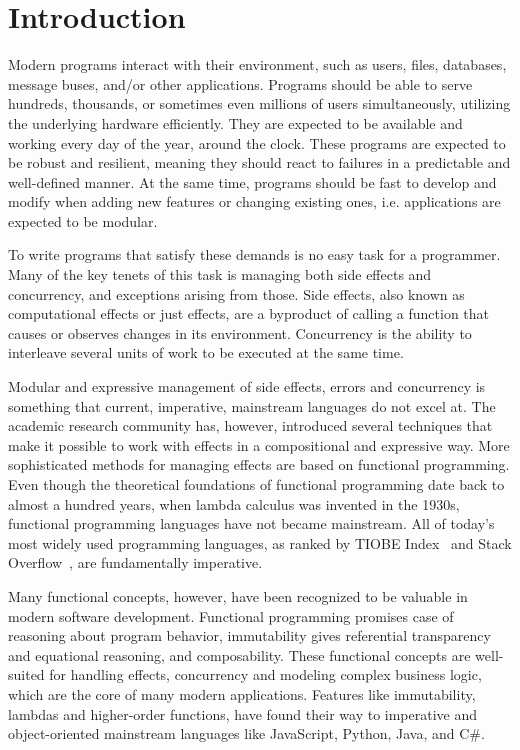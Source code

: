 \chapter{Introduction} \label{Introduction}

Modern programs interact with their environment, such as users, files, databases, message buses, and/or other applications. Programs should be able to serve hundreds, thousands, or sometimes even millions of users simultaneously, utilizing the underlying hardware efficiently. They are expected to be available and working every day of the year, around the clock. These programs are expected to be robust and resilient, meaning they should react to failures in a predictable and well-defined manner. At the same time, programs should be fast to develop and modify when adding new features or changing existing ones, i.e. applications are expected to be modular.

To write programs that satisfy these demands is no easy task for a programmer. Many of the key tenets of this task is managing both side effects and concurrency, and exceptions arising from those. Side effects, also known as computational effects or just effects, are a byproduct of calling a function that causes or observes changes in its environment. Concurrency is the ability to interleave several units of work to be executed at the same time.

Modular and expressive management of side effects, errors and concurrency is something that current, imperative, mainstream languages do not excel at. The academic research community has, however, introduced several techniques that make it possible to work with effects in a compositional and expressive way. More sophisticated methods for managing effects are based on functional programming. Even though the theoretical foundations of functional programming date back to almost a hundred years, when lambda calculus was invented in the 1930s, functional programming languages have not became mainstream. All of today's most widely used programming languages, as ranked by TIOBE Index~\cite{tiobe-index} and Stack Overflow~\cite{sof-dev-survey}, are fundamentally imperative.

Many functional concepts, however, have been recognized to be valuable in modern software development. Functional programming promises case of reasoning about program behavior, immutability gives referential transparency and equational reasoning, and composability. These functional concepts are well-suited for handling effects, concurrency and modeling complex business logic, which are the core of many modern applications. Features like immutability, lambdas and higher-order functions, have found their way to imperative and object-oriented mainstream languages like JavaScript, Python, Java, and C\#.

